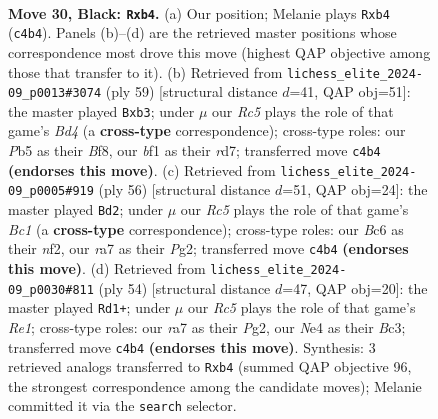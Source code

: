 \documentclass[11pt]{article}
\begin{document}
\clearpage

\begin{figure}[p]\centering
\begin{subfigure}{0.46\textwidth}\centering
\resizebox{\linewidth}{!}{%
\newchessgame
\chessboard[
  setfen={6k1/R4pp1/2b1p3/1p5p/1PrPnP1P/4P1P1/8/3N1BK1 b - - 0 30},
  showmover=false,
  pgfstyle=straightmove, color=movearrow, markmove={c4-b4}
]}
\caption{}
\end{subfigure}\hfill
\begin{subfigure}{0.46\textwidth}\centering
\resizebox{\linewidth}{!}{%
\newchessgame
\chessboard[
  setfen={5bk1/3R1p2/1p3pp1/3b3p/1r1P3P/1P2P1P1/5P2/R5K1 b - - 3 30},
  showmover=false,
  pgfstyle=straightmove, color=movearrow, markmove={d5-b3}
]}
\caption{}
\end{subfigure}
\\[4pt]
\begin{subfigure}{0.46\textwidth}\centering
\resizebox{\linewidth}{!}{%
\newchessgame
\chessboard[
  setfen={6k1/bpp2p2/p6p/P2P2p1/2r5/1R3N2/1P3nPP/2B2K2 w - - 0 29},
  showmover=false,
  pgfstyle=straightmove, color=movearrow, markmove={c1-d2}
]}
\caption{}
\end{subfigure}\hfill
\begin{subfigure}{0.46\textwidth}\centering
\resizebox{\linewidth}{!}{%
\newchessgame
\chessboard[
  setfen={4rb2/p1pk2p1/1p3pnp/5N2/2P5/1PB4P/P4PP1/4R1K1 w - - 6 28},
  showmover=false,
  pgfstyle=straightmove, color=movearrow, markmove={e1-d1}
]}
\caption{}
\end{subfigure}
\caption{\textbf{Move 30, Black: \texttt{Rxb4}.} (a) Our position; Melanie plays \texttt{Rxb4} (\texttt{c4b4}). Panels (b)--(d) are the retrieved master positions whose correspondence most drove this move (highest QAP objective among those that transfer to it). (b) Retrieved from \texttt{lichess\_elite\_2024-09\_p0013\#3074} (ply 59) [structural distance $d$=41, QAP obj=51]: the master played \texttt{Bxb3}; under $\mu$ our \emph{Rc5} plays the role of that game's \emph{Bd4} (a \textbf{cross-type} correspondence); cross-type roles: our \emph{P}b5 as their \emph{B}f8, our \emph{b}f1 as their \emph{r}d7; transferred move \texttt{c4b4} \textbf{(endorses this move)}. (c) Retrieved from \texttt{lichess\_elite\_2024-09\_p0005\#919} (ply 56) [structural distance $d$=51, QAP obj=24]: the master played \texttt{Bd2}; under $\mu$ our \emph{Rc5} plays the role of that game's \emph{Bc1} (a \textbf{cross-type} correspondence); cross-type roles: our \emph{B}c6 as their \emph{n}f2, our \emph{r}a7 as their \emph{P}g2; transferred move \texttt{c4b4} \textbf{(endorses this move)}. (d) Retrieved from \texttt{lichess\_elite\_2024-09\_p0030\#811} (ply 54) [structural distance $d$=47, QAP obj=20]: the master played \texttt{Rd1+}; under $\mu$ our \emph{Rc5} plays the role of that game's \emph{Re1}; cross-type roles: our \emph{r}a7 as their \emph{P}g2, our \emph{N}e4 as their \emph{B}c3; transferred move \texttt{c4b4} \textbf{(endorses this move)}. Synthesis: 3 retrieved analogs transferred to \texttt{Rxb4} (summed QAP objective 96, the strongest correspondence among the candidate moves); Melanie committed it via the \texttt{search} selector.}
\label{fig:thought-m59}
\end{figure}
\end{document}

